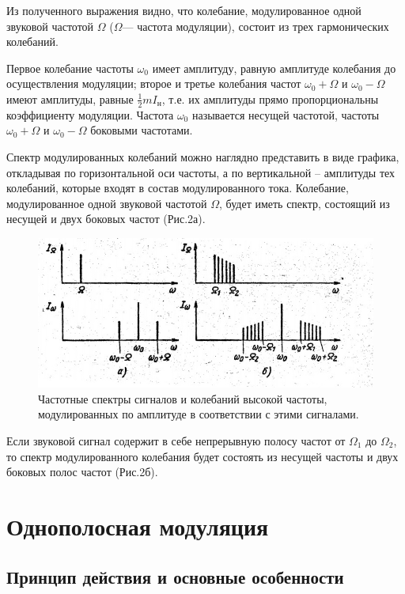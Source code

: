 Из полученного выражения видно, что колебание, модулированное одной звуковой частотой $\Omega$ ($\Omega$— частота модуляции), состоит из трех гармонических колебаний.

Первое колебание частоты $\omega_0$ имеет амплитуду, равную амплитуде колебания до осуществления модуляции; второе и третье колебания частот $\omega_0+\Omega$ и $\omega_0-\Omega$ имеют амплитуды, равные $\frac12mI_{\text{н}}$, т.е. их амплитуды прямо пропорциональны коэффициенту модуляции. Частота $\omega_0$ называется несущей частотой, частоты $\omega_0+\Omega$ и $\omega_0-\Omega$ боковыми частотами.

Спектр модулированных колебаний можно наглядно представить в виде графика, откладывая по горизонтальной оси частоты, а по вертикальной – амплитуды тех колебаний, которые входят в состав модулированного тока. Колебание, модулированное одной звуковой частотой $\Omega$, будет иметь спектр, состоящий из несущей и двух боковых частот (Рис.2а).

\begin{figure}[h!]
	\centering
	\includegraphics[scale=1.5]{fig/fig2}
	\caption{ Частотные спектры сигналов и колебаний высокой частоты,
	модулированных по амплитуде в соответствии с этими сигналами.}
	\label{fig:fig2}
\end{figure}

Если звуковой сигнал содержит в себе непрерывную полосу частот от $\Omega_1$ до $\Omega_2$, то спектр модулированного колебания будет состоять из несущей частоты и двух боковых полос частот (Рис.2б).

\section{Однополосная модуляция}
\subsection{Принцип действия и основные особенности}

